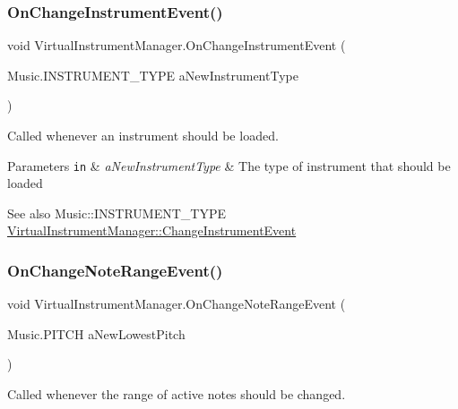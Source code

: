\subsubsection{\texorpdfstring{On\+Change\+Instrument\+Event()}{OnChangeInstrumentEvent()}}
{\footnotesize\ttfamily void Virtual\+Instrument\+Manager.\+On\+Change\+Instrument\+Event (\begin{DoxyParamCaption}\item[{Music.\+I\+N\+S\+T\+R\+U\+M\+E\+N\+T\+\_\+\+T\+Y\+PE}]{a\+New\+Instrument\+Type }\end{DoxyParamCaption})}



Called whenever an instrument should be loaded. 


\begin{DoxyParams}[1]{Parameters}
\mbox{\tt in}  & {\em a\+New\+Instrument\+Type} & The type of instrument that should be loaded\\
\hline
\end{DoxyParams}
\begin{DoxySeeAlso}{See also}
Music\+::\+I\+N\+S\+T\+R\+U\+M\+E\+N\+T\+\_\+\+T\+Y\+PE \hyperlink{class_virtual_instrument_manager_1_1_change_instrument_event}{Virtual\+Instrument\+Manager\+::\+Change\+Instrument\+Event} 
\end{DoxySeeAlso}
\mbox{\label{group___virtual_instrument_manager_event_types_ga660c766dceebfc830de2cf96686692df}} 
\subsubsection{\texorpdfstring{On\+Change\+Note\+Range\+Event()}{OnChangeNoteRangeEvent()}}
{\footnotesize\ttfamily void Virtual\+Instrument\+Manager.\+On\+Change\+Note\+Range\+Event (\begin{DoxyParamCaption}\item[{Music.\+P\+I\+T\+CH}]{a\+New\+Lowest\+Pitch }\end{DoxyParamCaption})}



Called whenever the range of active notes should be changed. 


